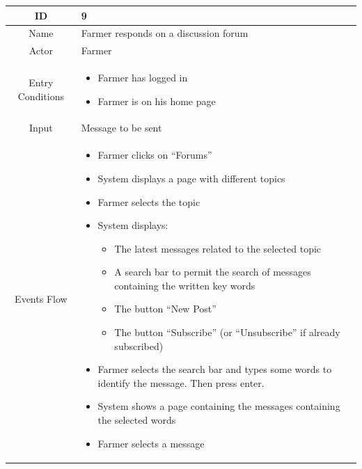 \documentclass{article}
\begin{document}
\begin{center}
    \begin{longtable}{|c| p{10cm}|}
        \hline
            ID & 9 \\
        \hline
            Name & Farmer responds on a discussion forum\\
        \hline
            Actor & Farmer \\
        \hline
            Entry Conditions & 
                                \begin{itemize}
                                    \item Farmer has logged in
                                    \item Farmer is on his home page
                                \end{itemize}\\
        \hline
            Input & Message to be sent \\
        \hline
            Events Flow &   \begin{itemize}
                                \item Farmer clicks on “Forums”
                                \item System displays a page with different topics  
                                \item Farmer selects the topic
                                \item System displays:
                                            \begin{itemize}
                                                \item The latest messages related to the selected topic
                                                \item A search bar to permit the search of messages containing the written key words
                                                \item The button “New Post” 
                                                \item The button “Subscribe” (or “Unsubscribe” if already subscribed)
                                            \end{itemize}
                                \item Farmer selects the search bar and types some words to identify the message. Then press enter.
                                \item System shows a page containing the messages containing the selected words
                                \item Farmer selects a message

\end{itemize}
\end{longtable}
\end{center}
\end{document}
